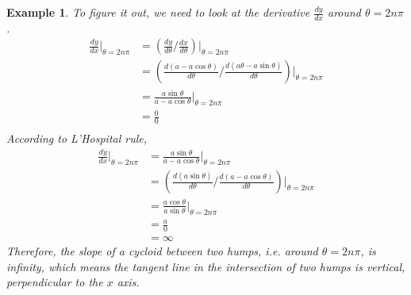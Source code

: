 \documentclass{article}
\newtheorem{example}{Example}
\begin{document}
\begin{example}
  To figure it out, we need to look at the derivative $\frac{dy}{dx}$ around 
  $\theta = 2n\pi$.
  \[
    \begin{split}
      \frac{dy}{dx}|_{\theta = 2n\pi} &= (\frac{dy}{d\theta} / \frac{dx}{d\theta})|_{\theta = 2n\pi} \\
                                      &= (\frac{d(a - a\cos\theta)}{d\theta} / \frac{d(a\theta - a\sin\theta)}{d\theta})|_{\theta = 2n\pi} \\
                                      &= \frac{a\sin\theta}{a - a\cos\theta}|_{\theta = 2n\pi} \\
                                      &= \frac{0}{0} \\
    \end{split}
  \]
  According to L'Hospital rule,
  \[
    \begin{split}
      \frac{dy}{dx}|_{\theta = 2n\pi} &= \frac{a\sin\theta}{a - a\cos\theta}|_{\theta = 2n\pi} \\
                                      &= (\frac{d(a\sin\theta)}{d\theta} / \frac{d(a - a\cos\theta)}{d\theta})|_{\theta = 2n\pi} \\
                                      &= \frac{a\cos\theta}{a\sin\theta}|_{\theta = 2n\pi} \\
                                      &= \frac{a}{0} \\
                                      &= \infty
    \end{split}
  \]
  Therefore, the slope of a cycloid between two humps, i.e. around 
  $\theta = 2n\pi$, is infinity, which means the tangent line in the 
  intersection of two humps is vertical, perpendicular to the $x$ axis.
\end{example}
 
\end{document}
